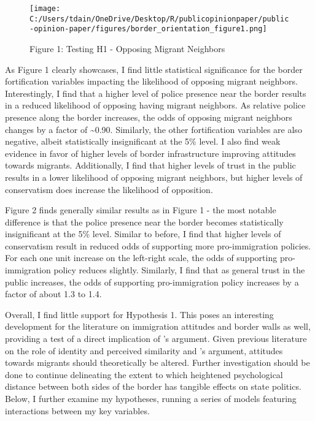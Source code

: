 \documentclass[12pt,]{article}
\begin{document}
\begin{figure}
\centering
\texttt{[image: C:/Users/tdain/OneDrive/Desktop/R/publicopinionpaper/public-opinion-paper/figures/border\_orientation\_figure1.png]}
\caption{Figure 1: Testing H1 - Opposing Migrant Neighbors}
\end{figure}

As Figure 1 clearly showcases, I find little statistical significance
for the border fortification variables impacting the likelihood of
opposing migrant neighbors. Interestingly, I find that a higher level of
police presence near the border results in a reduced likelihood of
opposing having migrant neighbors. As relative police presence along the
border increases, the odds of opposing migrant neighbors changes by a
factor of \textasciitilde0.90. Similarly, the other fortification
variables are also negative, albeit statistically insignificant at the
5\% level. I also find weak evidence in favor of higher levels of border
infrastructure improving attitudes towards migrants. Additionally, I
find that higher levels of trust in the public results in a lower
likelihood of opposing migrant neighbors, but higher levels of
conservatism does increase the likelihood of opposition.

Figure 2 finds generally similar results as in Figure 1 - the most
notable difference is that the police presence near the border becomes
statistically insignificant at the 5\% level. Similar to before, I find
that higher levels of conservatism result in reduced odds of supporting
more pro-immigration policies. For each one unit increase on the
left-right scale, the odds of supporting pro-immigration policy reduces
slightly. Similarly, I find that as general trust in the public
increases, the odds of supporting pro-immigration policy increases by a
factor of about 1.3 to 1.4.

Overall, I find little support for Hypothesis 1. This poses an
interesting development for the literature on immigration attitudes and
border walls as well, providing a test of a direct implication of
\citet{mutz2022}'s argument. Given previous literature on the role of
identity and perceived similarity and \citet{mutz2022}'s argument,
attitudes towards migrants should theoretically be altered. Further
investigation should be done to continue delineating the extent to which
heightened psychological distance between both sides of the border has
tangible effects on state politics. Below, I further examine my
hypotheses, running a series of models featuring interactions between my
key variables.
\end{document}

